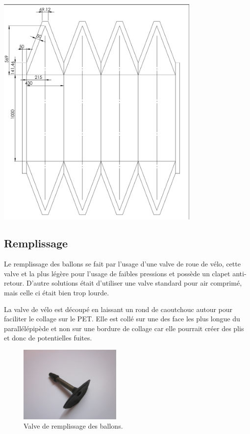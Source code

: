 \documentclass[a4paper,11pt]{article}
\begin{document}
\begin{center}
 \includegraphics[width=10cm]{../Images/plan_ballon.png}
\end{center}


\subsection{Remplissage}

Le remplissage des ballons se fait par l'usage d'une valve de roue de vélo, cette valve et la plus légère pour l'usage de faibles pressions et possède un clapet anti-retour. D'autre solutions était d'utiliser une valve standard pour air comprimé, mais celle ci était bien trop lourde.

La valve de vélo est découpé en laissant un rond de caoutchouc autour pour faciliter le collage sur le PET. Elle est collé sur une des face les plus longue du parallélépipède et non sur une bordure de collage car elle pourrait créer des plis et donc de potentielles fuites.

\begin{figure}[H]
  \centering
  \includegraphics[width=5cm]{../Images/valve.JPG}
  \caption{Valve de remplissage des ballons.}
\end{figure}
\end{document}
